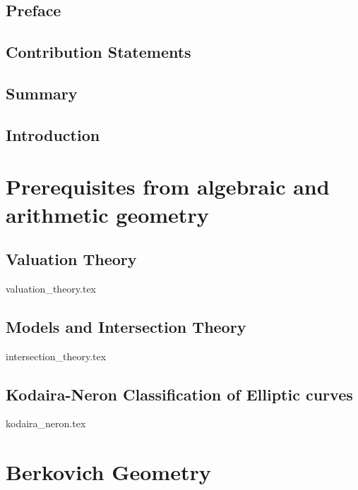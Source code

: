 


\rmfamily
\setcounter{page}{0}
\newpage
\chapter*{Preface} \label{chap:preface}
\chapter*{Contribution Statements} \label{chap:acknowledgements}
\chapter*{Summary} \label{chap:introduction}
\tableofcontents
\listoftodos


\setcounter{page}{0}

\chapter{Introduction} \label{chap:introduction}
%

\part{Prerequisites from algebraic and arithmetic geometry}
\chapter{Valuation Theory} \label{chap:valuation_theory}
{valuation_theory.tex}



\chapter{Models and Intersection Theory} \label{chap:models_and_intersection_theory}
{intersection_theory.tex}

\chapter{Kodaira-Neron Classification of Elliptic curves} \label{chap:kodaira_neron_classification_of_elliptic_curves}
{kodaira_neron.tex}

\part{Berkovich Geometry}
